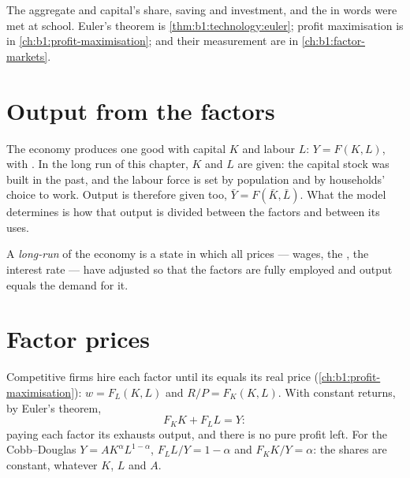 \begin{recall}
The aggregate  and capital's share, saving and
investment,  and the  in words were met at
school. Euler's theorem is \cref{thm:b1:technology:euler}; profit
maximisation is in \cref{ch:b1:profit-maximisation};  and
their measurement are in \cref{ch:b1:factor-markets}.
\end{recall}

\section{Output from the factors}\label{sec:b1:long-run-model:output}

The economy produces one good with capital $K$ and labour $L$:
$Y = F(K, L)$, with . In the long run of this
chapter, $K$ and $L$ are given: the capital stock was built in the past, and
the labour force is set by population and by households' choice to work.
Output is therefore given too, $\bar Y = F(\bar K, \bar L)$. What the model determines is
how that output is divided between the factors and between its uses.

\begin{definition}\label{def:b1:long-run-model:long-run}
A \emph{long-run } of the economy is a state in which all
prices --- wages, the , the interest rate --- have
adjusted so that the factors are fully employed and output equals the
demand for it.
\end{definition}

\section{Factor prices}\label{sec:b1:long-run-model:factors}

Competitive firms hire each factor until its  equals its
real price (\cref{ch:b1:profit-maximisation}): $w = F_L(K, L)$ and
$R/P = F_K(K, L)$. With constant returns, by Euler's theorem,
\[
F_K K + F_L L = Y:
\]
paying each factor its  exhausts output, and there is no
pure profit left. For the Cobb--Douglas $Y = AK^{\alpha}L^{1-\alpha}$, $F_L L/Y = 1 - \alpha$ and
$F_K K/Y = \alpha$: the shares are constant, whatever $K$, $L$ and $A$.

